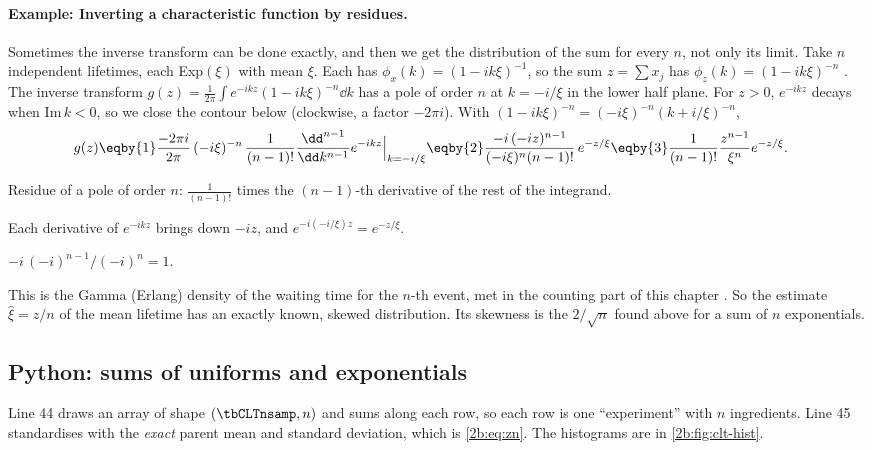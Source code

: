 \paragraph{Example: Inverting a characteristic function by residues.}
\label{2b:ex:cowan-residue}
Sometimes the inverse transform can be done exactly, and then we get the distribution of the sum for every $n$, not only its limit. Take $n$ independent lifetimes, each Exp$(\xi)$ with mean $\xi$. Each has $\phi_x(k)=(1-ik\xi)^{-1}$, so the sum $z=\sum x_j$ has $\phi_z(k)=(1-ik\xi)^{-n}$ . The inverse transform $g(z)=\frac{1}{2\pi}\int e^{-ikz}(1-ik\xi)^{-n}\dd k$ has a pole of order $n$ at $k=-i/\xi$ in the lower half plane. For $z>0$, $e^{-ikz}$ decays when $\mathrm{Im}\,k<0$, so we close the contour below (clockwise, a factor $-2\pi i$). With $(1-ik\xi)^{-n}=(-i\xi)^{-n}(k+i/\xi)^{-n}$,
\begin{align*}
  g(z)
  &\eqby{1} \frac{-2\pi i}{2\pi}\,(-i\xi)^{-n}\,\frac{1}{(n-1)!}\frac{\dd^{n-1}}{\dd k^{n-1}}e^{-ikz}\Big|_{k=-i/\xi}
  \eqby{2} \frac{-i\,(-iz)^{n-1}}{(-i\xi)^{n}(n-1)!}\,e^{-z/\xi}
  \eqby{3} \frac{1}{(n-1)!}\frac{z^{n-1}}{\xi^n}e^{-z/\xi} .
\end{align*}
\begin{explain}
  \item Residue of a pole of order $n$: $\frac{1}{(n-1)!}$ times the $(n-1)$-th derivative of the rest of the integrand.
  \item Each derivative of $e^{-ikz}$ brings down $-iz$, and $e^{-i(-i/\xi)z}=e^{-z/\xi}$.
  \item $-i\,(-i)^{n-1}/(-i)^n=1$.
\end{explain}
This is the Gamma (Erlang) density of the waiting time for the $n$-th event, met in the counting part of this chapter . So the estimate $\hat\xi=z/n$ of the mean lifetime has an exactly known, skewed distribution. Its skewness is the $2/\sqrt n$ found above for a sum of $n$ exponentials.

\subsection{Python: sums of uniforms and exponentials}
\label{2b:sec:clt-python}


Line 44 draws an array of shape $(\tbCLTnsamp,n)$ and sums along each row, so each row is one ``experiment'' with $n$ ingredients. Line 45 standardises with the \emph{exact} parent mean and standard deviation, which is \eqref{2b:eq:zn}. The histograms are in \cref{2b:fig:clt-hist}.

